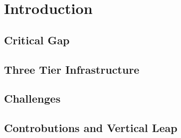 \chapter{Introduction}
	

\section{Critical Gap}
    



\section{Three Tier Infrastructure}\label{sec:threeTier}
	
		
		
		
	\section{Challenges}\label{sec:challenges}
		




    	\section{Controbutions and Vertical Leap}
		





			
			
			
			
			

	


